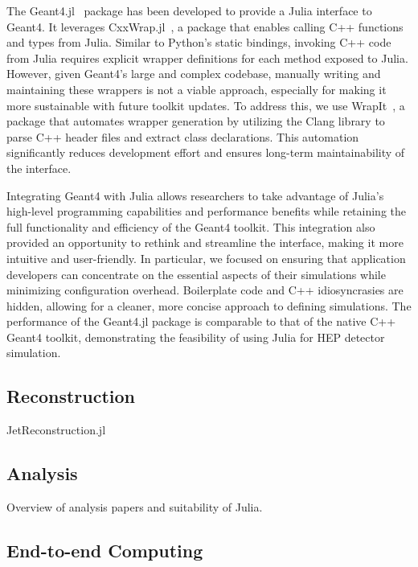 \documentclass{webofc}
\begin{document}
The Geant4.jl~\cite{geant4-jl-github} package has been developed to provide a
Julia interface to Geant4. It leverages CxxWrap.jl~\cite{CxxWrap.jl}, a
package that enables calling C++ functions and types from Julia. Similar to
Python's static bindings, invoking C++ code from Julia requires explicit wrapper
definitions for each method exposed to Julia. However, given Geant4's large and
complex codebase, manually writing and maintaining these wrappers is not a
viable approach, especially for making it more sustainable with future toolkit
updates. To address this, we use WrapIt~\cite{wrapit-github}, a package that
automates wrapper generation by utilizing the Clang library to parse C++ header
files and extract class declarations. This automation significantly reduces
development effort and ensures long-term maintainability of the interface.

Integrating Geant4 with Julia allows researchers to take advantage of Julia's
high-level programming capabilities and performance benefits while retaining the
full functionality and efficiency of the Geant4 toolkit. This integration also
provided an opportunity to rethink and streamline the interface, making it more
intuitive and user-friendly. In particular, we focused on ensuring that
application developers can concentrate on the essential aspects of their
simulations while minimizing configuration overhead. Boilerplate code and C++
idiosyncrasies are hidden, allowing for a cleaner, more concise approach to
defining simulations. The performance of the Geant4.jl package is comparable to
that of the native C++ Geant4 toolkit, demonstrating the feasibility of using
Julia for HEP detector simulation.

\subsection{Reconstruction}

JetReconstruction.jl

\subsection{Analysis}

Overview of analysis papers and suitability of Julia.

\subsection{End-to-end Computing}
\end{document}
